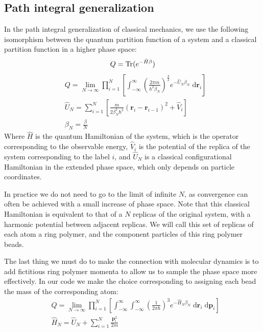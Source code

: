 \documentclass[12pt,fleqn]{report}
\newcommand{\dd}{\; \mathrm{d}}
\newcommand{\Tr}{\mathrm{Tr}}
\newcommand{\betan}{\beta_N}
\begin{document}
\subsection{Path integral generalization}
In the path integral generalization of classical mechanics, we use the 
following isomorphism between the quantum partition function of a system and a 
classical partition function in a higher phase space:
\begin{equation}
Q = \Tr (e^{-\hat{H} \beta}) \\
\end{equation}
\begin{align}
&Q = \lim_{N\to \infty} \prod_{i=1}^N \left[ \int_{-\infty}^\infty  
\left( \frac{ 2 \pi m}{h^2 \betan} \right) ^{\frac{3}{2}} 
e^{-\hat{U}_N \betan} \dd \textbf{r}_i \right] \\
& \hat{U}_N=
\sum_{i=1}^N \left[ \frac{m}{2 \betan^2 \hbar^2}(\textbf{r}_i-\textbf{r}_{i-1})^2+\hat{V}_i \right] \\
&\betan = \frac{\beta}{N} \nonumber
\end{align}
Where \(\hat{H}\) is the quantum Hamiltonian of the system, which is the 
operator corresponding to the observable energy, \(\hat{V}_i\) is the potential 
of the replica of the system corresponding to the label \(i\), and \(\hat{U}_N\)
is a classical configurational Hamiltonian in the extended phase space, which 
only depends on particle coordinates. 

In practice we do not need to go to the limit of infinite \(N\), as 
convergence can often be achieved with a small increase of phase space. Note 
that this classical Hamiltonian is equivalent to that of a \(N\) replicas of 
the original system, with a harmonic potential between adjacent replicas. 
We will call this set of replicas of each atom a ring polymer, and the 
component particles of this ring polymer beads.

The last thing we must do to make the connection with molecular dynamics is to 
add fictitious ring polymer momenta to allow us to sample the phase space more 
effectively. In our code we make the choice corresponding to assigning each 
bead the mass of the corresponding atom:
\begin{align}
&Q = \lim_{N\to \infty} \prod_{i=1}^N \left[ \int_{-\infty}^\infty  
\int_{-\infty}^\infty \left( \frac{ 1 }{2 \pi \hbar} \right) ^3 
e^{-\hat{H}_N \betan} \dd \textbf{r}_i \dd \textbf{p}_i \right] \\
&\hat{H}_N = \hat{U}_N + \sum_{i=1}^N \frac{\textbf{p}_i^2}{2 m}
\end{align}
\end{document}
